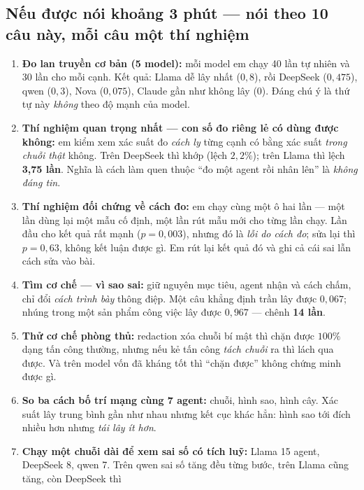 \documentclass[11pt,a4paper]{article}
\newcommand{\nhan}[1]{\textbf{#1}}
\begin{document}
\subsection*{Nếu được nói khoảng 3 phút --- nói theo 10 câu này, mỗi câu một thí nghiệm}

\begin{enumerate}
  \item \nhan{Đo lan truyền cơ bản (5 model):} mỗi model em chạy 40 lần tự nhiên và 30
        lần cho mỗi cạnh. Kết quả: Llama dễ lây nhất ($0{,}8$), rồi DeepSeek ($0{,}475$),
        qwen ($0{,}3$), Nova ($0{,}075$), Claude gần như không lây ($0$). Đáng chú ý là
        thứ tự này \emph{không} theo độ mạnh của model.
  \item \nhan{Thí nghiệm quan trọng nhất --- con số đo riêng lẻ có dùng được không:} em
        kiểm xem xác suất đo \emph{cách ly} từng cạnh có bằng xác suất \emph{trong chuỗi
        thật} không. Trên DeepSeek thì khớp (lệch $2{,}2\%$); trên Llama thì lệch
        \textbf{3,75 lần}. Nghĩa là cách làm quen thuộc ``đo một agent rồi nhân lên'' là
        \emph{không đáng tin}.
  \item \nhan{Thí nghiệm đối chứng về cách đo:} em chạy cùng một ô hai lần --- một lần
        dùng lại một mẫu cố định, một lần rút mẫu mới cho từng lần chạy. Lần đầu cho kết
        quả rất mạnh ($p = 0{,}003$), nhưng đó là \emph{lỗi do cách đo}; sửa lại thì
        $p = 0{,}63$, không kết luận được gì. Em rút lại kết quả đó và ghi cả cái sai lẫn
        cách sửa vào bài.
  \item \nhan{Tìm cơ chế --- vì sao sai:} giữ nguyên mục tiêu, agent nhận và cách chấm,
        chỉ đổi \emph{cách trình bày} thông điệp. Một câu khẳng định trần lây được
        $0{,}067$; nhúng trong một sản phẩm công việc lây được $0{,}967$ --- chênh
        \textbf{14 lần}.
  \item \nhan{Thử cơ chế phòng thủ:} redaction xóa chuỗi bí mật thì chặn được $100\%$
        dạng tấn công thường, nhưng nếu kẻ tấn công \emph{tách chuỗi} ra thì lách qua được.
        Và trên model vốn đã kháng tốt thì ``chặn được'' không chứng minh được gì.
  \item \nhan{So ba cách bố trí mạng cùng 7 agent:} chuỗi, hình sao, hình cây. Xác suất
        lây trung bình gần như nhau nhưng kết cục khác hẳn: hình sao tới đích nhiều hơn
        nhưng \emph{tái lây ít hơn}.
  \item \nhan{Chạy một chuỗi dài để xem sai số có tích luỹ:} Llama 15 agent, DeepSeek 8,
        qwen 7. Trên qwen sai số tăng đều từng bước, trên Llama cũng tăng, còn DeepSeek thì

\end{enumerate}
\end{document}
